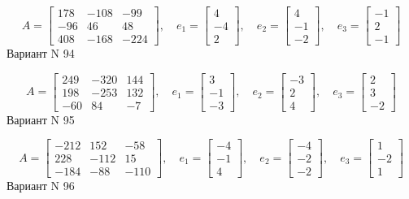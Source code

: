 \documentclass[11pt]{report}
\begin{document}
$$A = \left[\begin{matrix}178 & -108 & -99\\-96 & 46 & 48\\408 & -168 & -224\end{matrix}\right],\quad e_1 = \left[\begin{matrix}4\\-4\\2\end{matrix}\right],\quad e_2 = \left[\begin{matrix}4\\-1\\-2\end{matrix}\right],\quad e_3 = \left[\begin{matrix}-1\\2\\-1\end{matrix}\right]$$Вариант N 94

$$A = \left[\begin{matrix}249 & -320 & 144\\198 & -253 & 132\\-60 & 84 & -7\end{matrix}\right],\quad e_1 = \left[\begin{matrix}3\\-1\\-3\end{matrix}\right],\quad e_2 = \left[\begin{matrix}-3\\2\\4\end{matrix}\right],\quad e_3 = \left[\begin{matrix}2\\3\\-2\end{matrix}\right]$$Вариант N 95

$$A = \left[\begin{matrix}-212 & 152 & -58\\228 & -112 & 15\\-184 & -88 & -110\end{matrix}\right],\quad e_1 = \left[\begin{matrix}-4\\-1\\4\end{matrix}\right],\quad e_2 = \left[\begin{matrix}-4\\-2\\-2\end{matrix}\right],\quad e_3 = \left[\begin{matrix}1\\-2\\1\end{matrix}\right]$$Вариант N 96
\end{document}
